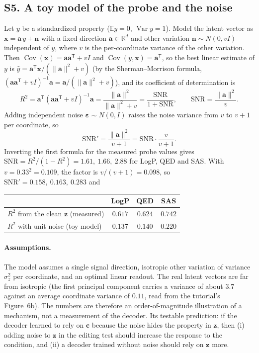 \documentclass[11pt]{article}
\newcommand{\T}{\mathsf{T}}
\newcommand{\E}{\mathbb{E}}
\newcommand{\R}{\mathbb{R}}
\DeclareMathOperator{\Var}{Var}
\begin{document}
\label{sec:S5}
\subsection*{S5. A toy model of the probe and the noise}
Let $y$ be a standardized property ($\E y=0$, $\Var y=1$). Model the latent vector as $\bm x=\bm a\,y+\bm n$ with a fixed direction $\bm a\in\R^d$ and other variation $\bm n\sim N(0,v I)$ independent of $y$, where $v$ is the per-coordinate variance of the other variation. Then $\operatorname{Cov}(\bm x)=\bm a\bm a^{\T}+vI$ and $\operatorname{Cov}(y,\bm x)=\bm a^{\T}$, so the best linear estimate of $y$ is $\hat y=\bm a^{\T}\bm x/(\lVert\bm a\rVert^2+v)$ (by the Sherman--Morrison formula, $(\bm a\bm a^{\T}+vI)^{-1}\bm a=\bm a/(\lVert\bm a\rVert^2+v)$), and its coefficient of determination is
\[
  R^2=\bm a^{\T}(\bm a\bm a^{\T}+vI)^{-1}\bm a=\frac{\lVert\bm a\rVert^2}{\lVert\bm a\rVert^2+v}=\frac{\mathrm{SNR}}{1+\mathrm{SNR}},\qquad \mathrm{SNR}=\frac{\lVert\bm a\rVert^2}{v}.
\]
Adding independent noise $\bm\varepsilon\sim N(0,I)$ raises the noise variance from $v$ to $v+1$ per coordinate, so
\[
  \mathrm{SNR}'=\frac{\lVert\bm a\rVert^2}{v+1}=\mathrm{SNR}\cdot\frac{v}{v+1}.
\]
Inverting the first formula for the measured probe values gives $\mathrm{SNR}=R^2/(1-R^2)=1.61,\ 1.66,\ 2.88$ for LogP, QED and SAS. With $v=0.33^2=0.109$, the factor is $v/(v+1)=0.098$, so $\mathrm{SNR}'=0.158,\ 0.163,\ 0.283$ and
\begin{center}
\small
\begin{tabular}{@{}lccc@{}}
\toprule
 & LogP & QED & SAS\\
\midrule
$R^2$ from the clean $\bm z$ (measured) & $0.617$ & $0.624$ & $0.742$\\
$R^2$ with unit noise (toy model) & $0.137$ & $0.140$ & $0.220$\\
\bottomrule
\end{tabular}
\end{center}
\paragraph{Assumptions.} The model assumes a single signal direction, isotropic other variation of variance $\sigma_z^2$ per coordinate, and an optimal linear readout. The real latent vectors are far from isotropic (the first principal component carries a variance of about $3.7$ against an average coordinate variance of $0.11$, read from the tutorial's Figure~6b). The numbers are therefore an order-of-magnitude illustration of a mechanism, not a measurement of the decoder. Its testable prediction: if the decoder learned to rely on $\bm c$ because the noise hides the property in $\bm z$, then (i) adding noise to $\bm z$ in the editing test should increase the response to the condition, and (ii) a decoder trained without noise should rely on $\bm z$ more.
\end{document}
